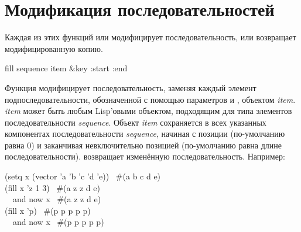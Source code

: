 \section{Модификация последовательностей}

Каждая из этих функций или модифицирует последовательность, или возвращает
модифицированную копию.

\begin{defun}[Функция]
fill sequence item &key :start :end

Функция модифицирует последовательность, заменяя каждый элемент
подпоследовательности, обозначенной с помощью параметров  и
, объектом \emph{item}. \emph{item} может быть любым Lisp'овыми 
объектом, подходящим для типа элементов последовательности \emph{sequence}. 
Объект \emph{item} сохраняется в всех указанных компонентах
последовательности \emph{sequence}, начиная с позиции  (по-умолчанию
равна 0) и заканчивая невключительно позицией  (по-умолчанию равна
длине последовательности).  возвращает изменённую последовательность.
Например:
\begin{lisp}
(setq x (vector 'a 'b 'c 'd 'e)) \EV\ \#(a b c d e) \\
(fill x 'z  1  3) \EV\ \#(a z z d e) \\
~~\textrm{and now} x \EV\ \#(a z z d e) \\
(fill x 'p) \EV\ \#(p p p p p) \\
~~\textrm{and now} x \EV\ \#(p p p p p)
\end{lisp}
\end{defun}

